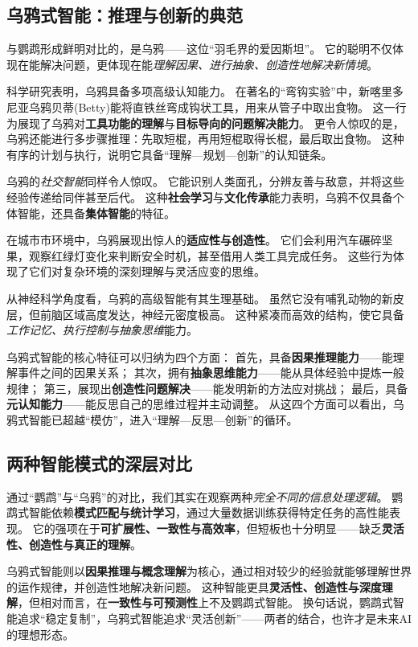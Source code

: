 \subsection{乌鸦式智能：推理与创新的典范}  

与鹦鹉形成鲜明对比的，是乌鸦——这位“羽毛界的爱因斯坦”。  
它的聪明不仅体现在能解决问题，更体现在能\emph{理解因果、进行抽象、创造性地解决新情境}。  

科学研究表明，乌鸦具备多项高级认知能力。  
在著名的“弯钩实验”中，新喀里多尼亚乌鸦贝蒂(Betty)能将直铁丝弯成钩状工具，用来从管子中取出食物。  
这一行为展现了乌鸦对\textbf{工具功能的理解}与\textbf{目标导向的问题解决能力}。  
更令人惊叹的是，乌鸦还能进行多步骤推理：先取短棍，再用短棍取得长棍，最后取出食物。  
这种有序的计划与执行，说明它具备“理解—规划—创新”的认知链条。

乌鸦的\emph{社交智能}同样令人惊叹。  
它能识别人类面孔，分辨友善与敌意，并将这些经验传递给同伴甚至后代。  
这种\textbf{社会学习}与\textbf{文化传承}能力表明，乌鸦不仅具备个体智能，还具备\textbf{集体智能}的特征。  

在城市市环境中，乌鸦展现出惊人的\textbf{适应性与创造性}。  
它们会利用汽车碾碎坚果，观察红绿灯变化来判断安全时机，甚至借用人类工具完成任务。  
这些行为体现了它们对复杂环境的深刻理解与灵活应变的思维。  

从神经科学角度看，乌鸦的高级智能有其生理基础。  
虽然它没有哺乳动物的新皮层，但前脑区域高度发达，神经元密度极高。  
这种紧凑而高效的结构，使它具备\emph{工作记忆、执行控制与抽象思维}能力。  

乌鸦式智能的核心特征可以归纳为四个方面：  
首先，具备\textbf{因果推理能力}——能理解事件之间的因果关系；  
其次，拥有\textbf{抽象思维能力}——能从具体经验中提炼一般规律；  
第三，展现出\textbf{创造性问题解决}——能发明新的方法应对挑战；  
最后，具备\textbf{元认知能力}——能反思自己的思维过程并主动调整。  
从这四个方面可以看出，乌鸦式智能已超越“模仿”，进入“理解—反思—创新”的循环。  

\subsection{两种智能模式的深层对比}

通过“鹦鹉”与“乌鸦”的对比，我们其实在观察两种\emph{完全不同的信息处理逻辑}。  
鹦鹉式智能依赖\textbf{模式匹配与统计学习}，通过大量数据训练获得特定任务的高性能表现。  
它的强项在于\textbf{可扩展性、一致性与高效率}，但短板也十分明显——缺乏\textbf{灵活性、创造性与真正的理解}。  

乌鸦式智能则以\textbf{因果推理与概念理解}为核心，通过相对较少的经验就能够理解世界的运作规律，并创造性地解决新问题。
这种智能更具\textbf{灵活性、创造性与深度理解}，但相对而言，在\textbf{一致性与可预测性}上不及鹦鹉式智能。  
换句话说，鹦鹉式智能追求“稳定复制”，乌鸦式智能追求“灵活创新”——两者的结合，也许才是未来AI的理想形态。  

